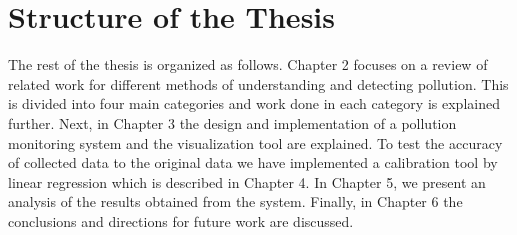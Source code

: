 \section{Structure of the Thesis}

The rest of the thesis is organized as follows. Chapter 2 focuses on a review of related work for different methods of understanding and detecting pollution. This is divided into four main categories and work done in each category is explained further. Next, in Chapter 3 the design and implementation of a pollution monitoring system and the visualization tool are explained. To test the accuracy of collected data to the original data we have implemented a calibration tool by linear regression which is described in Chapter 4. In Chapter 5, we present an analysis of the results obtained from the system. Finally, in Chapter 6 the conclusions and directions for future work are discussed.